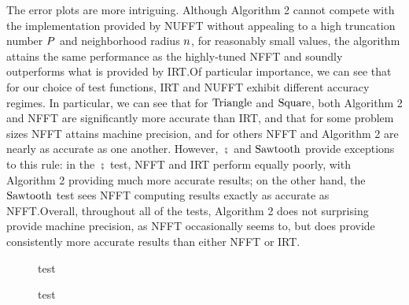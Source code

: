 The error plots are more intriguing. Although Algorithm 2 cannot
compete with the implementation provided by NUFFT without appealing to
a high truncation number $P$ and neighborhood radius
$n$, for reasonably small values, the algorithm
attains the same performance as the highly-tuned NFFT and soundly
outperforms what is provided by IRT.\@ Of particular importance, we
can see that for our choice of test functions, IRT and NUFFT exhibit
different accuracy regimes. In particular, we can see that for $\operatorname{Triangle}$
and $\operatorname{Square}$, both Algorithm 2 and NFFT are significantly more accurate
than IRT, and that for some problem sizes NFFT attains machine
precision, and for others NFFT and Algorithm 2 are nearly as accurate
as one another. However, $\semi$ and $\operatorname{Sawtooth}$ provide exceptions to this
rule: in the $\semi$ test, NFFT and IRT perform equally poorly, with
Algorithm 2 providing much more accurate results; on the other hand,
the $\operatorname{Sawtooth}$ test sees NFFT computing results exactly as accurate as
NFFT.\@ Overall, throughout all of the tests, Algorithm 2 does not
surprising provide machine precision, as NFFT occasionally seems to,
but does provide consistently more accurate results than either NFFT
or IRT.\@

\begin{figure}[h]
  \centering
  
  \caption{test}\label{fig:raddiff}
\end{figure}

\begin{figure}[h]
  \centering
  
  \caption{test}\label{fig:errorbound}
\end{figure}

